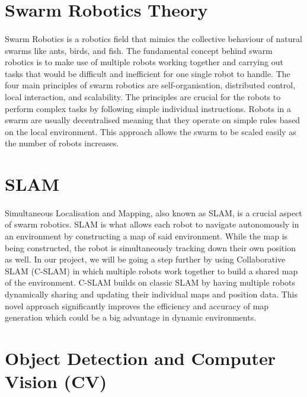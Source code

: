 \section{Swarm Robotics Theory}

\paragraph*{}
Swarm Robotics is a robotics field that mimics the collective behaviour of natural swarms like ants, birds, and fish. The fundamental concept behind swarm robotics is to make use of multiple robots working together and carrying out tasks that would be difficult and inefficient for one single robot to handle. The four main principles of swarm robotics are self-organisation, distributed control, local interaction, and scalability. The principles are crucial for the robots to perform complex tasks by following simple individual instructions. Robots in a swarm are usually decentralised meaning that they operate on simple rules based on the local environment. This approach allows the swarm to be scaled easily as the number of robots increases\cite{beni1989swarm}.

\section{SLAM}

\paragraph*{}
Simultaneous Localisation and Mapping, also known as SLAM, is a crucial aspect of swarm robotics. SLAM is what allows each robot to navigate autonomously in an environment by constructing a map of said environment. While the map is being constructed, the robot is simultaneously tracking down their own position as well\cite{thrun2003probabilistic}. In our project, we will be going a step further by using Collaborative SLAM (C-SLAM) in which multiple robots work together to build a shared map of the environment. C-SLAM builds on classic SLAM by having multiple robots dynamically sharing and updating their individual maps and position data. This novel approach significantly improves the efficiency and accuracy of map generation which could be a big advantage in dynamic environments.

\section{Object Detection and Computer Vision (CV)}

